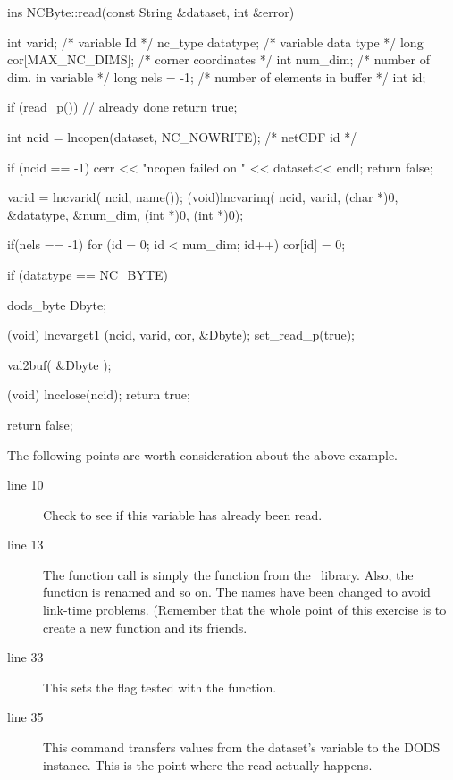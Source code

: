 \begin{vcode}{ins}
NCByte::read(const String &dataset, int &error) 
{
   int varid;                  /* variable Id */
   nc_type datatype;           /* variable data type */
   long cor[MAX_NC_DIMS];      /* corner coordinates */
   int num_dim;                /* number of dim. in variable */
   long nels = -1;             /* number of elements in buffer */
   int id;

   if (read_p()) // already done
     return true;

   int ncid = lncopen(dataset, NC_NOWRITE); /* netCDF id */

   if (ncid == -1) { 
     cerr << "ncopen failed on " << dataset<< endl;
     return false;
   }
 
   varid = lncvarid( ncid, name());
   (void)lncvarinq( ncid, varid, (char *)0, &datatype, 
                    &num_dim, (int *)0, (int *)0);

   if(nels == -1){  
     for (id = 0; id < num_dim; id++) 
       cor[id] = 0;
   }

   if (datatype == NC_BYTE){
     dods_byte Dbyte;

     (void) lncvarget1 (ncid, varid, cor, &Dbyte);
     set_read_p(true);
          
     val2buf( &Dbyte );

     (void) lncclose(ncid);  
     return true;
   }
   return false;
}
\end{vcode}

The following points are worth consideration about the above example.

\begin{description}
\item[line 10] Check to see if this variable has already been read.
\item[line 13] The  function call is simply the
   function from the \netcdf\ library. Also, the
   function is renamed  and so on.  The
  names have been changed to avoid link-time problems.  (Remember that
  the whole point of this exercise is to create a new 
  function and its friends.
\item[line 33] This sets the flag tested with the 
  function.
\item[line 35] This command transfers values from the dataset's
  variable to the DODS instance.  This is the point where the read
  actually happens.
\end{description}

